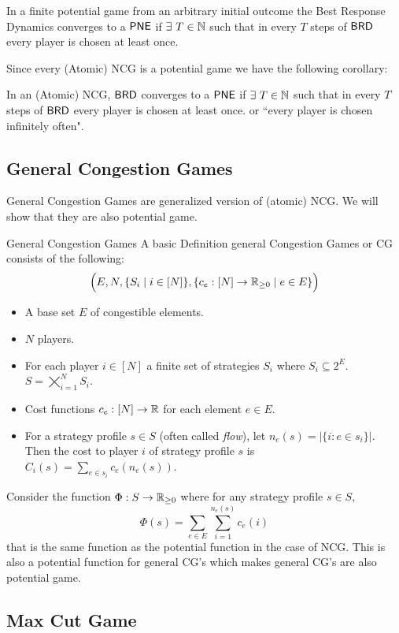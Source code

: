 \begin{Theorem}{}{}
	In a finite potential game from an arbitrary initial outcome the Best Response Dynamics converges to a $\operatorname{\mathsf{PNE}}$ if $\exists\ T\in\mathbb{N}$ such that in every $T$ steps of $\operatorname{\mathsf{BRD}}$ every player is chosen at least once.
\end{Theorem}

Since every (Atomic) NCG is a potential game we have the following corollary:
\begin{corolary}{}{}
	In an (Atomic) NCG, $\operatorname{\mathsf{BRD}}$ converges to a $\operatorname{\mathsf{PNE}}$ if $\exists\ T\in\mathbb{N}$ such that in every $T$ steps of $\operatorname{\mathsf{BRD}}$ every player is chosen at least once. or ``every player is chosen infinitely often".
\end{corolary}


\subsection{General Congestion Games}
General Congestion Games are generalized version of (atomic) NCG. We will show that they are also potential game.
\begin{Definition}{General Congestion Games}{}
	A basic Definition general Congestion Games or CG consists of the following: $$\Big(E,N, \{S_i\mid i\in[N]\}, \{c_e:[N]\to \mathbb{R}_{\geq 0}\mid e\in E\}\Big)$$
	\begin{itemize}[itemsep=-1mm]
		\item A base set $E$ of congestible elements.
		\item $N$ players.
		\item For each player $i\in[N]$ a finite set of strategies $S_i$ where $S_i\subseteq 2^E$. $S=\bigtimes\limits_{i=1}^N S_i$.
		\item Cost functions $c_e:[N]\to \mathbb{R}$ for each element $e\in E$.
		\item For a strategy profile $s\in S$ (often called \textit{flow}), let $n_e(s)=|\{i\colon e\in s_i\}|$. Then the cost to player $i$ of strategy profile $s$ is $C_i(s)=\sum\limits_{e\in s_i}c_e(n_e(s))$. 
	\end{itemize}
\end{Definition}

 Consider the  function $\Phi:S\to \mathbb{R}_{\geq 0}$ where for any strategy profile $s\in S$, $$\Phi(s)=\sum\limits_{e\in E}\sum\limits_{i=1}^{n_e(s)}c_e(i)$$ that is the same function as the potential function in the case of NCG. This is also a potential function for general CG's which makes general CG's are also potential game.
\subsection{Max Cut Game}

